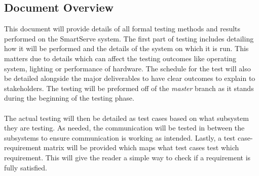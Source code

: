 \documentclass[11pt]{article}
\begin{document}
\subsection{Document Overview}
This document will provide details of all formal testing methods and results performed on the SmartServe system. The first part of testing includes detailing how it will be performed and the details of the system on which it is run. This matters due to details which can affect the testing outcomes like operating system, lighting or performance of hardware. The schedule for the test will also be detailed alongside the major deliverables to have clear outcomes to explain to stakeholders. The testing will be preformed off of the \textit{master} branch as it stands during the beginning of the testing phase. \\ \\
The actual testing will then be detailed as test cases based on what subsystem they are testing. As needed, the communication will be tested in between the subsystems to ensure communication is working as intended. Lastly, a test case-requirement matrix will be provided which maps what test cases test which requirement. This will give the reader a simple way to check if a requirement is fully satisfied.
\end{document}
